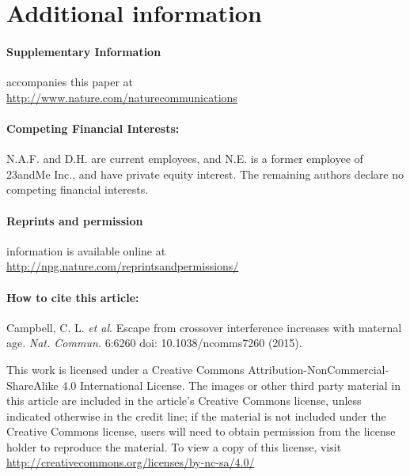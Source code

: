 \section{Additional information}

\paragraph{Supplementary Information} accompanies this paper at \\ \url{http://www.nature.com/naturecommunications}

\paragraph{Competing Financial Interests:} N.A.F. and D.H. are current employees, and N.E. is a
former employee of 23andMe Inc., and have private equity interest. The remaining
authors declare no competing financial interests.

\paragraph{Reprints and permission} information is available online at \\
\url{http://npg.nature.com/reprintsandpermissions/}

\paragraph{How to cite this article:} Campbell, C. L. \textit{et al}. Escape from crossover interference
increases with maternal age. \textit{Nat. Commun.} 6:6260 doi: 10.1038/ncomms7260 (2015).

\bigskip \noindent
This work is licensed under a 
Creative Commons Attribution-NonCommercial-ShareAlike 4.0 International License. The images or
other third party material in this article are included in the article's Creative Commons
license, unless indicated otherwise in the credit line; if the material is not included under
the Creative Commons license, users will need to obtain permission from the license
holder to reproduce the material. To view a copy of this license, visit \\
\url{http://creativecommons.org/licenses/by-nc-sa/4.0/}

\renewcommand{\bibname}{References}
\begingroup
    \setlength{\bibsep}{10pt}
    \linespread{1}\selectfont
    
\endgroup

